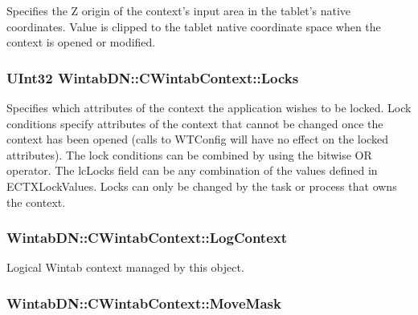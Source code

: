 Specifies the Z origin of the context's input area in the tablet's native coordinates. Value is clipped to the tablet native coordinate space when the context is opened or modified. 

\hypertarget{class_wintab_d_n_1_1_c_wintab_context_a187da57874b1c4508be2ab344f7b0ea4}{
\subsubsection[{Locks}]{\setlength{\rightskip}{0pt plus 5cm}UInt32 WintabDN::CWintabContext::Locks}}
\label{class_wintab_d_n_1_1_c_wintab_context_a187da57874b1c4508be2ab344f7b0ea4}


Specifies which attributes of the context the application wishes to be locked. Lock conditions specify attributes of the context that cannot be changed once the context has been opened (calls to WTConfig will have no effect on the locked attributes). The lock conditions can be combined by using the bitwise OR operator. The lcLocks field can be any combination of the values defined in ECTXLockValues. Locks can only be changed by the task or process that owns the context. 

\hypertarget{class_wintab_d_n_1_1_c_wintab_context_a7d64da6a0f08eeb371ef4dac5e9f0077}{
\subsubsection[{LogContext}]{ WintabDN::CWintabContext::LogContext}}
\label{class_wintab_d_n_1_1_c_wintab_context_a7d64da6a0f08eeb371ef4dac5e9f0077}


Logical Wintab context managed by this object. 

\hypertarget{class_wintab_d_n_1_1_c_wintab_context_af330693f2499261616e121c7604bac78}{
\subsubsection[{MoveMask}]{ WintabDN::CWintabContext::MoveMask}}
\label{class_wintab_d_n_1_1_c_wintab_context_af330693f2499261616e121c7604bac78}


